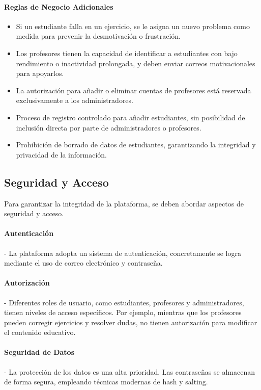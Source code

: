 \paragraph{Reglas de Negocio Adicionales}
\begin{itemize}
\item Si un estudiante falla en un ejercicio, se le asigna un nuevo problema como medida para prevenir la desmotivación o frustración.
\item Los profesores tienen la capacidad de identificar a estudiantes con bajo rendimiento o inactividad prolongada, y deben enviar correos motivacionales para apoyarlos.
\item La autorización para añadir o eliminar cuentas de profesores está reservada exclusivamente a los administradores.
\item Proceso de registro controlado para añadir estudiantes, sin posibilidad de inclusión directa por parte de administradores o profesores.
\item Prohibición de borrado de datos de estudiantes, garantizando la integridad y privacidad de la información.
\end{itemize}

\subsection{Seguridad y Acceso}

Para garantizar la integridad de la plataforma, se deben abordar aspectos de seguridad y acceso.

\paragraph{Autenticación} - La plataforma adopta un sistema de autenticación, concretamente se logra mediante el uso de correo electrónico y contraseña. 

\paragraph{Autorización} - Diferentes roles de usuario, como estudiantes, profesores y administradores, tienen niveles de acceso específicos. Por ejemplo, mientras que los profesores pueden corregir ejercicios y resolver dudas, no tienen autorización para modificar el contenido educativo.

\paragraph{Seguridad de Datos} - La protección de los datos es una alta prioridad. Las contraseñas se almacenan de forma segura, empleando técnicas modernas de hash y salting. 

